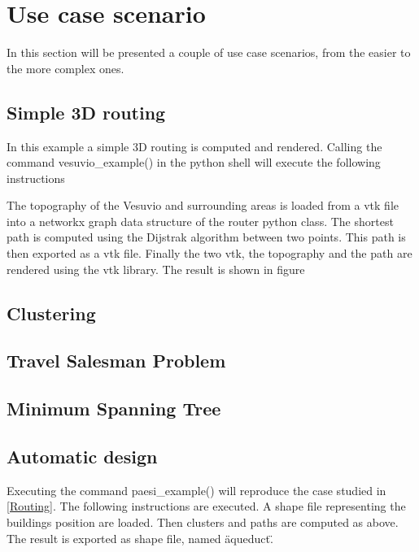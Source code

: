 \chapter{Use case scenario}
\label{appendiceE}
\thispagestyle{empty}

\noindent In this section will be presented a couple of use case scenarios, from the easier to 
the more complex ones.

\section{Simple 3D routing}


In this example a simple 3D routing is computed and rendered. Calling the command vesuvio_example() 
in the python shell will execute the following instructions 


The topography of the Vesuvio and surrounding areas is loaded from a vtk file into a networkx graph 
data structure of the router python class. The shortest path is computed using the Dijstrak algorithm 
between two points. This path is then exported as a vtk file. Finally the two vtk, the topography and the path are rendered using the vtk library. The result is shown in figure 


\section{Clustering}
\section{Travel Salesman Problem}
\section{Minimum Spanning Tree}

\section{Automatic design}
Executing the command paesi_example() will reproduce the case studied in \ref{Routing}. The following 
instructions are executed. A shape file representing the buildings position  
are loaded. Then clusters and paths are computed as above. The result is exported as shape file, 
named \"aqueduct\".